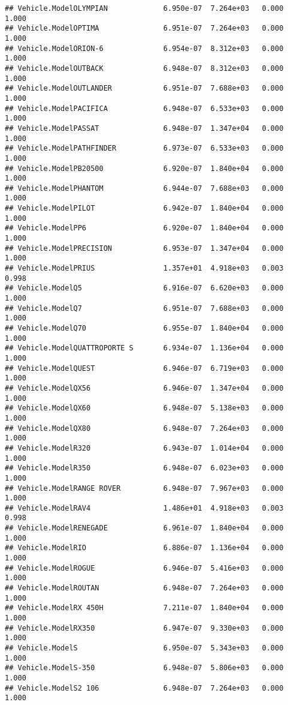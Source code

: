 \documentclass[
]{article}
\begin{document}
\begin{verbatim}
## Vehicle.ModelOLYMPIAN             6.950e-07  7.264e+03   0.000    1.000
## Vehicle.ModelOPTIMA               6.951e-07  7.264e+03   0.000    1.000
## Vehicle.ModelORION-6              6.954e-07  8.312e+03   0.000    1.000
## Vehicle.ModelOUTBACK              6.948e-07  8.312e+03   0.000    1.000
## Vehicle.ModelOUTLANDER            6.951e-07  7.688e+03   0.000    1.000
## Vehicle.ModelPACIFICA             6.948e-07  6.533e+03   0.000    1.000
## Vehicle.ModelPASSAT               6.948e-07  1.347e+04   0.000    1.000
## Vehicle.ModelPATHFINDER           6.973e-07  6.533e+03   0.000    1.000
## Vehicle.ModelPB20500              6.920e-07  1.840e+04   0.000    1.000
## Vehicle.ModelPHANTOM              6.944e-07  7.688e+03   0.000    1.000
## Vehicle.ModelPILOT                6.942e-07  1.840e+04   0.000    1.000
## Vehicle.ModelPP6                  6.920e-07  1.840e+04   0.000    1.000
## Vehicle.ModelPRECISION            6.953e-07  1.347e+04   0.000    1.000
## Vehicle.ModelPRIUS                1.357e+01  4.918e+03   0.003    0.998
## Vehicle.ModelQ5                   6.916e-07  6.620e+03   0.000    1.000
## Vehicle.ModelQ7                   6.951e-07  7.688e+03   0.000    1.000
## Vehicle.ModelQ70                  6.955e-07  1.840e+04   0.000    1.000
## Vehicle.ModelQUATTROPORTE S       6.934e-07  1.136e+04   0.000    1.000
## Vehicle.ModelQUEST                6.946e-07  6.719e+03   0.000    1.000
## Vehicle.ModelQX56                 6.946e-07  1.347e+04   0.000    1.000
## Vehicle.ModelQX60                 6.948e-07  5.138e+03   0.000    1.000
## Vehicle.ModelQX80                 6.948e-07  7.264e+03   0.000    1.000
## Vehicle.ModelR320                 6.943e-07  1.014e+04   0.000    1.000
## Vehicle.ModelR350                 6.948e-07  6.023e+03   0.000    1.000
## Vehicle.ModelRANGE ROVER          6.948e-07  7.967e+03   0.000    1.000
## Vehicle.ModelRAV4                 1.486e+01  4.918e+03   0.003    0.998
## Vehicle.ModelRENEGADE             6.961e-07  1.840e+04   0.000    1.000
## Vehicle.ModelRIO                  6.886e-07  1.136e+04   0.000    1.000
## Vehicle.ModelROGUE                6.946e-07  5.416e+03   0.000    1.000
## Vehicle.ModelROUTAN               6.948e-07  7.264e+03   0.000    1.000
## Vehicle.ModelRX 450H              7.211e-07  1.840e+04   0.000    1.000
## Vehicle.ModelRX350                6.947e-07  9.330e+03   0.000    1.000
## Vehicle.ModelS                    6.950e-07  5.343e+03   0.000    1.000
## Vehicle.ModelS-350                6.948e-07  5.806e+03   0.000    1.000
## Vehicle.ModelS2 106               6.948e-07  7.264e+03   0.000    1.000

\end{verbatim}
\end{document}
